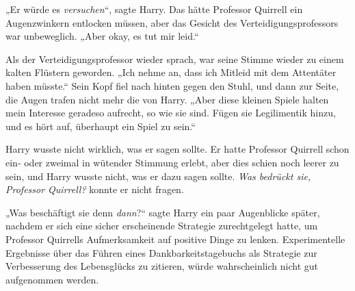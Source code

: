 „Er würde es \emph{versuchen}“, sagte Harry. Das hätte Professor Quirrell ein Augenzwinkern entlocken müssen, aber das Gesicht des Verteidigungsprofessors war unbeweglich.
„Aber okay, es tut mir leid.“

Als der Verteidigungsprofessor wieder sprach, war seine Stimme wieder zu einem kalten Flüstern geworden.
„Ich nehme an, dass ich Mitleid mit dem Attentäter haben müsste.“ Sein Kopf fiel nach hinten gegen den Stuhl, und dann zur Seite, die Augen trafen nicht mehr die von Harry.
„Aber diese kleinen Spiele halten mein Interesse geradeso aufrecht, so wie sie sind. Fügen sie Legilimentik hinzu, und es hört auf, überhaupt ein Spiel zu sein.“

Harry wusste nicht wirklich, was er sagen sollte. Er hatte Professor Quirrell schon ein- oder zweimal in wütender Stimmung erlebt, aber dies schien noch leerer zu sein, und Harry wusste nicht, was er dazu sagen sollte. \emph{Was bedrückt sie, Professor Quirrell?} konnte er nicht fragen.

„Was beschäftigt sie denn \emph{dann}?“ sagte Harry ein paar Augenblicke später, nachdem er sich eine sicher erscheinende Strategie zurechtgelegt hatte, um Professor Quirrells Aufmerksamkeit auf positive Dinge zu lenken. Experimentelle Ergebnisse über das Führen eines Dankbarkeitstagebuchs als Strategie zur Verbesserung des Lebensglücks zu zitieren, würde wahrscheinlich nicht gut aufgenommen werden.

